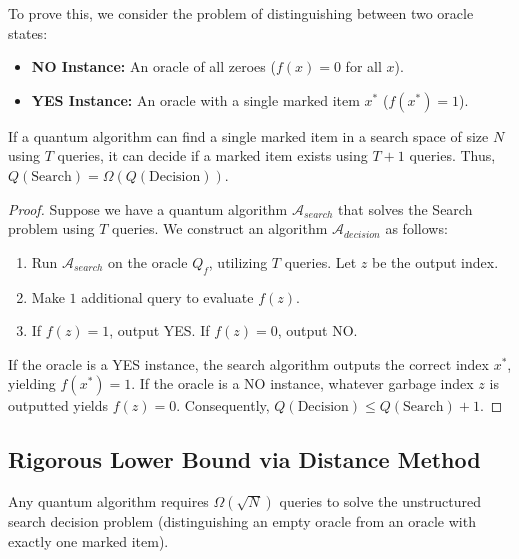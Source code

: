 To prove this, we consider the problem of distinguishing between two oracle states:
\begin{itemize}
    \item \textbf{NO Instance:} An oracle of all zeroes ($f(x) = 0$ for all $x$).
    \item \textbf{YES Instance:} An oracle with a single marked item $x^*$ ($f(x^*) = 1$).
\end{itemize}

\begin{lemma}
    If a quantum algorithm can find a single marked item in a search space of size $N$ using $T$ queries, it can decide if a marked item exists using $T+1$ queries. Thus, $Q(\text{Search}) = \Omega(Q(\text{Decision}))$.
\end{lemma}

\begin{proof}
    Suppose we have a quantum algorithm $\mathcal{A}_{search}$ that solves the Search problem using $T$ queries. We construct an algorithm $\mathcal{A}_{decision}$ as follows:
    \begin{enumerate}
        \item Run $\mathcal{A}_{search}$ on the oracle $Q_f$, utilizing $T$ queries. Let $z$ be the output index.
        \item Make $1$ additional query to evaluate $f(z)$.
        \item If $f(z) = 1$, output YES. If $f(z) = 0$, output NO.
    \end{enumerate}
    If the oracle is a YES instance, the search algorithm outputs the correct index $x^*$, yielding $f(x^*) = 1$. If the oracle is a NO instance, whatever garbage index $z$ is outputted yields $f(z) = 0$. Consequently, $Q(\text{Decision}) \leq Q(\text{Search}) + 1$.
\end{proof}

\subsection{Rigorous Lower Bound via Distance Method}

\begin{theorem}
    Any quantum algorithm requires $\Omega(\sqrt{N})$ queries to solve the unstructured search decision problem (distinguishing an empty oracle from an oracle with exactly one marked item).
\end{theorem}

